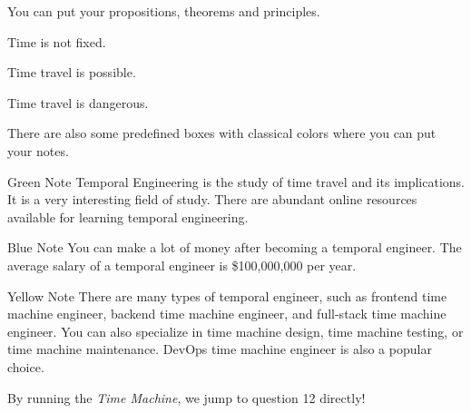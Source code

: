 

You can put your propositions, theorems and principles.
\begin{proposition}
    Time is not fixed.
\end{proposition}

\begin{theorem}
    Time travel is possible.
\end{theorem}

\begin{principle}
    Time travel is dangerous.
\end{principle}

There are also some predefined boxes with classical colors where you can put your notes. 
\begin{greenbox}{Green Note}
    Temporal Engineering is the study of time travel and its implications. It is a very interesting field of study. There are abundant online resources available for learning temporal engineering.
\end{greenbox}

\begin{bluebox}{Blue Note}
    You can make a lot of money after becoming a temporal engineer. The average salary of a temporal engineer is \$100,000,000 per year.
\end{bluebox}

\begin{yellowbox}{Yellow Note}
    There are many types of temporal engineer, such as frontend time machine engineer, backend time machine engineer, and full-stack time machine engineer. You can also specialize in time machine design, time machine testing, or time machine maintenance. DevOps time machine engineer is also a popular choice.
\end{yellowbox}



    

By running the \textit{Time Machine}, we jump to question 12 directly!

